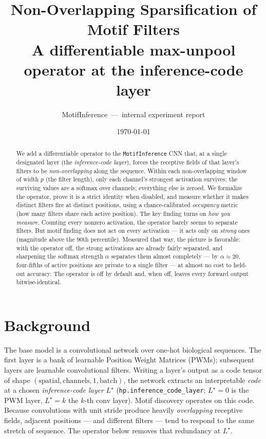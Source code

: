 \documentclass[11pt]{article}
\title{\textbf{Non-Overlapping Sparsification of Motif Filters}\\[2pt]
\large A differentiable max-unpool operator at the inference-code layer}
\author{MotifInference \,---\, internal experiment report}
\date{\today}
\begin{document}
\maketitle

\begin{abstract}
We add a differentiable operator to the \texttt{MotifInference} CNN that, at a single
designated layer (the \emph{inference-code layer}), forces the receptive fields of that
layer's filters to be \emph{non-overlapping} along the sequence. Within each
non-overlapping window of width $p$ (the filter length), only each channel's strongest
activation survives; the surviving values are a softmax over channels; everything else is
zeroed. We formalize the operator, prove it is a strict identity when disabled, and
measure whether it makes distinct filters fire at distinct positions, using a
chance-calibrated \emph{occupancy} metric (how many filters share each active position).
The key finding turns on \emph{how you measure}. Counting every nonzero activation, the operator
barely seems to separate filters. But motif finding does not act on every activation --- it acts
only on \emph{strong} ones (magnitude above the $90$th percentile). Measured that way, the picture
is favorable: with the operator off, the strong activations are already fairly separated, and
sharpening the softmax strength $\alpha$ separates them almost completely --- by $\alpha\approx20$,
four-fifths of active positions are private to a single filter --- at almost no cost to held-out
accuracy. The operator is off by default and, when off, leaves every forward output
bitwise-identical.
\end{abstract}

\section{Background}
The base model is a convolutional network over one-hot biological sequences. The first
layer is a bank of learnable Position Weight Matrices (PWMs); subsequent layers are
learnable convolutional filters. Writing a layer's output as a code tensor of shape
$(\text{spatial}, \text{channels}, 1, \text{batch})$, the network extracts an
interpretable \emph{code} at a chosen \emph{inference-code layer} $L^\star$
(\texttt{hp.inference\_code\_layer}; $L^\star=0$ is the PWM layer, $L^\star=k$ the $k$-th
conv layer). Motif discovery operates on this code. Because convolutions with unit stride
produce heavily \emph{overlapping} receptive fields, adjacent positions --- and different
filters --- tend to respond to the same stretch of sequence. The operator below removes
that redundancy at $L^\star$.
\end{document}
